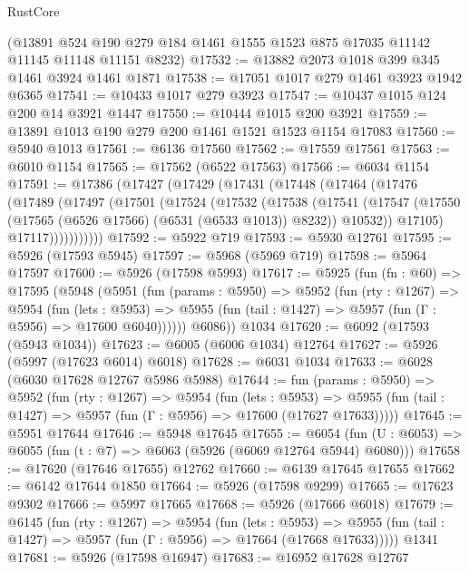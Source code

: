\begin{lexlean}{RustCore}
\begin{coremodule}
    (@13891 @524 @190 @279 @184 @1461 @1555 @1523 @875 @17035 @11142 @11145 @11148 @11151 @8232)
@17532 := @13882 @2073 @1018 @399 @345 @1461 @3924 @1461 @1871
@17538 := @17051 @1017 @279 @1461 @3923 @1942 @6365
@17541 := @10433 @1017 @279 @3923
@17547 := @10437 @1015 @124 @200 @14 @3921 @1447
@17550 := @10444 @1015 @200 @3921
@17559 := @13891 @1013 @190 @279 @200 @1461 @1521 @1523 @1154 @17083
@17560 := @5940 @1013
@17561 := @6136 @17560
@17562 := @17559 @17561
@17563 := @6010 @1154
@17565 := @17562 (@6522 @17563)
@17566 := @6034 @1154
@17591 := @17386
    (@17427
      (@17429
        (@17431
          (@17448
            (@17464
              (@17476
                (@17489
                  (@17497
                    (@17501
                      (@17524
                        (@17532
                          (@17538
                            (@17541
                              (@17547
                                (@17550 (@17565 (@6526 @17566) (@6531 (@6533 @1013)) @8232))
                                @10532))
                            @17105)
                          @17117)))))))))))
@17592 := @5922 @719
@17593 := @5930 @12761
@17595 := @5926 (@17593 @5945)
@17597 := @5968 (@5969 @719)
@17598 := @5964 @17597
@17600 := @5926 (@17598 @5993)
@17617 := @5925
    (fun (fn : @60) =>
    @17595
      (@5948
        (@5951
          (fun (params : @5950) =>
          @5952
            (fun (rty : @1267) =>
            @5954
              (fun (lets : @5953) =>
              @5955 (fun (tail : @1427) => @5957 (fun (Γ : @5956) => @17600 @6040))))))
        @6086))
    @1034
@17620 := @6092 (@17593 (@5943 @1034))
@17623 := @6005 (@6006 @1034) @12764
@17627 := @5926 (@5997 (@17623 @6014) @6018)
@17628 := @6031 @1034
@17633 := @6028 (@6030 @17628 @12767 @5986 @5988)
@17644 := fun (params : @5950) =>
  @5952
    (fun (rty : @1267) =>
    @5954
      (fun (lets : @5953) =>
      @5955 (fun (tail : @1427) => @5957 (fun (Γ : @5956) => @17600 (@17627 @17633)))))
@17645 := @5951 @17644
@17646 := @5948 @17645
@17655 := @6054
    (fun (U : @6053) => @6055 (fun (t : @7) => @6063 (@5926 (@6069 @12764 @5944) @6080)))
@17658 := @17620 (@17646 @17655) @12762
@17660 := @6139 @17645 @17655
@17662 := @6142 @17644 @1850
@17664 := @5926 (@17598 @9299)
@17665 := @17623 @9302
@17666 := @5997 @17665
@17668 := @5926 (@17666 @6018)
@17679 := @6145
    (fun (rty : @1267) =>
    @5954
      (fun (lets : @5953) =>
      @5955 (fun (tail : @1427) => @5957 (fun (Γ : @5956) => @17664 (@17668 @17633)))))
    @1341
@17681 := @5926 (@17598 @16947)
@17683 := @16952 @17628 @12767

\end{coremodule}
\end{lexlean}
